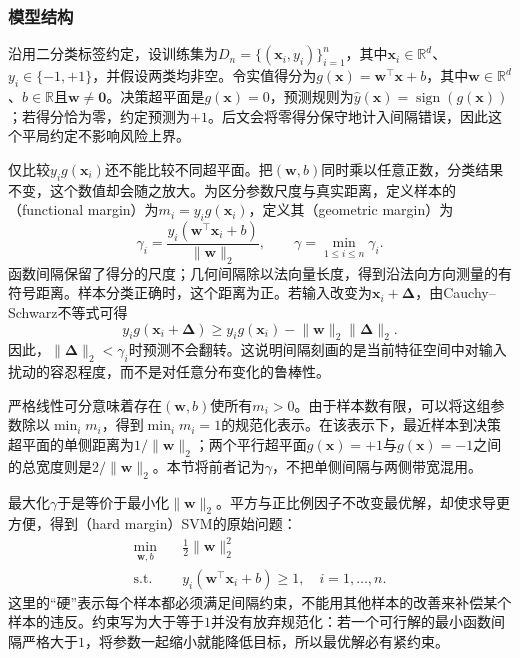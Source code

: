 \subsubsection{模型结构}
\label{sec:classification-svm-model}

沿用二分类标签约定，设训练集为$D_n=\{(\bm{x}_i,y_i)\}_{i=1}^n$，其中$\bm{x}_i\in\mathbb{R}^d$、$y_i\in\{-1,+1\}$，并假设两类均非空。令实值得分为$g(\bm{x})=\bm{w}^{\top}\bm{x}+b$，其中$\bm{w}\in\mathbb{R}^d$、$b\in\mathbb{R}$且$\bm{w}\ne\bm{0}$。决策超平面是$g(\bm{x})=0$，预测规则为$\hat y(\bm{x})=\operatorname{sign}(g(\bm{x}))$；若得分恰为零，约定预测为$+1$。后文会将零得分保守地计入间隔错误，因此这个平局约定不影响风险上界。

仅比较$y_i g(\bm{x}_i)$还不能比较不同超平面。把$(\bm{w},b)$同时乘以任意正数，分类结果不变，这个数值却会随之放大。为区分参数尺度与真实距离，定义样本的（functional margin）为$m_i=y_i g(\bm{x}_i)$，定义其（geometric margin）为
\begin{equation}
  \gamma_i
  =\frac{y_i(\bm{w}^{\top}\bm{x}_i+b)}
         {\lVert\bm{w}\rVert_2},
  \qquad
  \gamma=\min_{1\le i\le n}\gamma_i.
  \label{eq:classification-svm-margin}
\end{equation}
函数间隔保留了得分的尺度；几何间隔除以法向量长度，得到沿法向方向测量的有符号距离。样本分类正确时，这个距离为正。若输入改变为$\bm{x}_i+\bm{\Delta}$，由Cauchy--Schwarz不等式可得
\[
  y_i g(\bm{x}_i+\bm{\Delta})
  \ge y_i g(\bm{x}_i)
      -\lVert\bm{w}\rVert_2\lVert\bm{\Delta}\rVert_2.
\]
因此，$\lVert\bm{\Delta}\rVert_2<\gamma_i$时预测不会翻转。这说明间隔刻画的是当前特征空间中对输入扰动的容忍程度，而不是对任意分布变化的鲁棒性。

严格线性可分意味着存在$(\bm{w},b)$使所有$m_i>0$。由于样本数有限，可以将这组参数除以$\min_i m_i$，得到$\min_i m_i=1$的规范化表示。在该表示下，最近样本到决策超平面的单侧距离为$1/\lVert\bm{w}\rVert_2$；两个平行超平面$g(\bm{x})=+1$与$g(\bm{x})=-1$之间的总宽度则是$2/\lVert\bm{w}\rVert_2$。本节将前者记为$\gamma$，不把单侧间隔与两侧带宽混用。

最大化$\gamma$于是等价于最小化$\lVert\bm{w}\rVert_2$。平方与正比例因子不改变最优解，却使求导更方便，得到（hard margin）SVM的原始问题：
\begin{equation}
  \begin{aligned}
    \min_{\bm{w},b}\quad&
      \frac12\lVert\bm{w}\rVert_2^2\\
    \text{s.t.}\quad&
      y_i(\bm{w}^{\top}\bm{x}_i+b)\ge1,
      \quad i=1,\ldots,n.
  \end{aligned}
  \label{eq:classification-svm-hard-primal}
\end{equation}
这里的“硬”表示每个样本都必须满足间隔约束，不能用其他样本的改善来补偿某个样本的违反。约束写为大于等于$1$并没有放弃规范化：若一个可行解的最小函数间隔严格大于$1$，将参数一起缩小就能降低目标，所以最优解必有紧约束。

